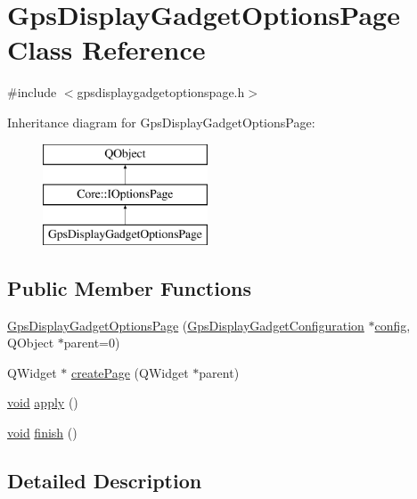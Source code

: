 \hypertarget{class_gps_display_gadget_options_page}{\section{Gps\-Display\-Gadget\-Options\-Page Class Reference}
\label{class_gps_display_gadget_options_page}
}


{\ttfamily \#include $<$gpsdisplaygadgetoptionspage.\-h$>$}

Inheritance diagram for Gps\-Display\-Gadget\-Options\-Page\-:\begin{figure}[H]
\begin{center}
\leavevmode
\includegraphics[height=3.000000cm]{class_gps_display_gadget_options_page}
\end{center}
\end{figure}
\subsection*{Public Member Functions}
\begin{DoxyCompactItemize}
\item 
\hyperlink{group___g_p_s_gadget_plugin_ga2cc5111e9489419740cbbfb61043fcd3}{Gps\-Display\-Gadget\-Options\-Page} (\hyperlink{class_gps_display_gadget_configuration}{Gps\-Display\-Gadget\-Configuration} $\ast$\hyperlink{deflate_8c_a4473b5227787415097004fd39f55185e}{config}, Q\-Object $\ast$parent=0)
\item 
Q\-Widget $\ast$ \hyperlink{group___g_p_s_gadget_plugin_gac8c534a784eaab5341c1baf07c5dec0b}{create\-Page} (Q\-Widget $\ast$parent)
\item 
\hyperlink{group___u_a_v_objects_plugin_ga444cf2ff3f0ecbe028adce838d373f5c}{void} \hyperlink{group___g_p_s_gadget_plugin_gae80bdcce5ad91f0ada2fcf74ee83242a}{apply} ()
\item 
\hyperlink{group___u_a_v_objects_plugin_ga444cf2ff3f0ecbe028adce838d373f5c}{void} \hyperlink{group___g_p_s_gadget_plugin_gaa513cdfb1866a8dec9976710811b48cb}{finish} ()
\end{DoxyCompactItemize}


\subsection{Detailed Description}


